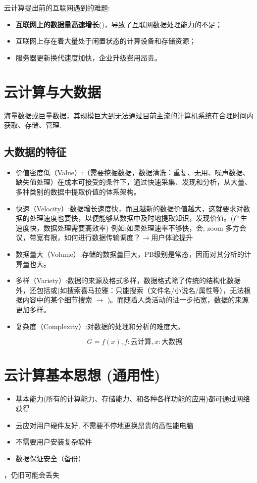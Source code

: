 云计算提出前的互联网遇到的难题:
\begin{itemize}
    \item \textbf{互联网上的数据量高速增长}()，导致了互联网数据处理能力的不足；
    \item 互联网上存在着大量处于闲置状态的计算设备和存储资源；
    \item 服务器更新换代速度加快，企业升级费用昂贵。
\end{itemize}

\section{云计算与大数据}

\begin{definition}
    海量数据或巨量数据，其规模巨大到无法通过目前主流的计算机系统在合理时间内获取、存储、管理.
\end{definition}

\subsection{大数据的特征}

\begin{itemize}
    \item 价值密度低（Value）:（需要挖掘数据，数据清洗：重复、无用、噪声数据、缺失值处理）在成本可接受的条件下，通过快速采集、发现和分析，从大量、多种类别的数据中提取价值的体系架构。

    \item 快速（Velocity）:数据增长速度快，而且越新的数据价值越大，这就要求对数据的处理速度也要快，以便能够从数据中及时地提取知识，发现价值。(产生速度快，数据处理需要高效率) 例如:如果处理速率不够快，会; zoom 多方会议，带宽有限，如何进行数据传输调度？$\rightarrow$用户体验提升

    \item 数据量大（Volume）:存储的数据量巨大，PB级别是常态，因而对其分析的计算量也大。

    \item  多样（Variety）:数据的来源及格式多样，数据格式除了传统的结构化数据外，还包括或(如搜索喜马拉雅：只能搜索（文件名/小说名/属性等），无法根据内容中的某个细节搜索 $\rightarrow$ )。而随着人类活动的进一步拓宽，数据的来源更加多样。

   \item 复杂度（Complexity）:对数据的处理和分析的难度大。

   $$G=f(x), f:\text{云计算}, x:\text{大数据}$$
\end{itemize}



\section{云计算基本思想 (通用性)}

\begin{itemize}
    \item 基本能力(所有的计算能力、存储能力、和各种各样功能的应用)都可通过网络获得
    \item 云应对用户硬件友好, 不需要不停地更换昂贵的高性能电脑
    \item 不需要用户安装复杂软件
    \item  数据保证安全（备份）
\end{itemize}

，仍旧可能会丢失